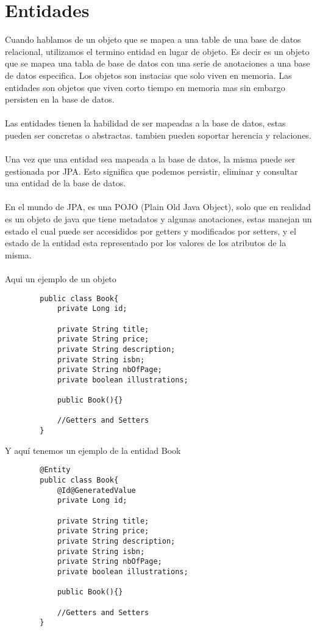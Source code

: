 \documentclass{article}
\begin{document}
\section*{Entidades}
Cuando hablamos de un objeto que se mapea a una table de una base de datos relacional, utilizamos el termino entidad en lugar de objeto.
Es decir es un objeto que se mapea una tabla de base de datos con una serie de anotaciones a una base de datos especifica. Los objetos son
instacias que solo viven en memoria. Las entidades son objetos que viven corto tiempo en memoria mas sin embargo persisten en la base de datos.\\ \\
Las entidades tienen la habilidad de ser mapeadas a la base de datos, estas pueden ser concretas o abstractas. tambien pueden soportar herencia y
relaciones. \\ \\
Una vez que una entidad sea mapeada a la base de datos, la misma puede ser gestionada por JPA. Esto significa que podemos persistir, eliminar y
consultar una entidad de la base de datos. \\ \\
En el mundo de JPA, es una POJO (Plain Old Java Object), solo que en realidad es un objeto de java que tiene metadatos y algunas anotaciones, estas
manejan un estado el cual puede ser accesididos por getters y modificados por setters, y el estado de la entidad esta representado por los valores
de los atributos de la misma. \\ \\

Aqui un ejemplo de un objeto
\begin{lstlisting}
        public class Book{
            private Long id; 

            private String title;
            private String price; 
            private String description;
            private String isbn;
            private String nbOfPage;
            private boolean illustrations;

            public Book(){}

            //Getters and Setters
        }
    \end{lstlisting}

Y aquí tenemos un ejemplo de la entidad Book
\begin{lstlisting}
        @Entity
        public class Book{
            @Id@GeneratedValue
            private Long id; 

            private String title;
            private String price; 
            private String description;
            private String isbn;
            private String nbOfPage;
            private boolean illustrations;

            public Book(){}

            //Getters and Setters
        }
        \end{lstlisting}
\end{document}
